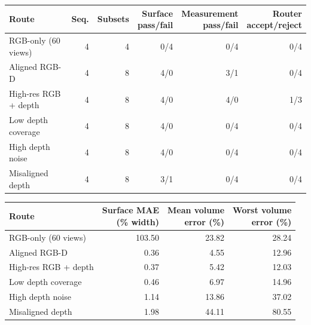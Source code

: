 \begin{tabularx}{\linewidth}{>{\raggedright\arraybackslash}X r r r r r}
\toprule
Route & Seq. & Subsets & \shortstack{Surface\\pass/fail} & \shortstack{Measurement\\pass/fail} & \shortstack{Router\\accept/reject} \\
\midrule
RGB-only (60 views) & 4 & 4 & 0/4 & 0/4 & 0/4 \\
Aligned RGB-D & 4 & 8 & 4/0 & 3/1 & 0/4 \\
High-res RGB + depth & 4 & 8 & 4/0 & 4/0 & 1/3 \\
Low depth coverage & 4 & 8 & 4/0 & 0/4 & 0/4 \\
High depth noise & 4 & 8 & 4/0 & 0/4 & 0/4 \\
Misaligned depth & 4 & 8 & 3/1 & 0/4 & 0/4 \\
\bottomrule
\end{tabularx}

\begin{tabularx}{\linewidth}{>{\raggedright\arraybackslash}X r r r}
\toprule
Route & \shortstack{Surface MAE\\(\% width)} & \shortstack{Mean volume\\error (\%)} & \shortstack{Worst volume\\error (\%)} \\
\midrule
RGB-only (60 views) & 103.50 & 23.82 & 28.24 \\
Aligned RGB-D & 0.36 & 4.55 & 12.96 \\
High-res RGB + depth & 0.37 & 5.42 & 12.03 \\
Low depth coverage & 0.46 & 6.97 & 14.96 \\
High depth noise & 1.14 & 13.86 & 37.02 \\
Misaligned depth & 1.98 & 44.11 & 80.55 \\
\bottomrule
\end{tabularx}
